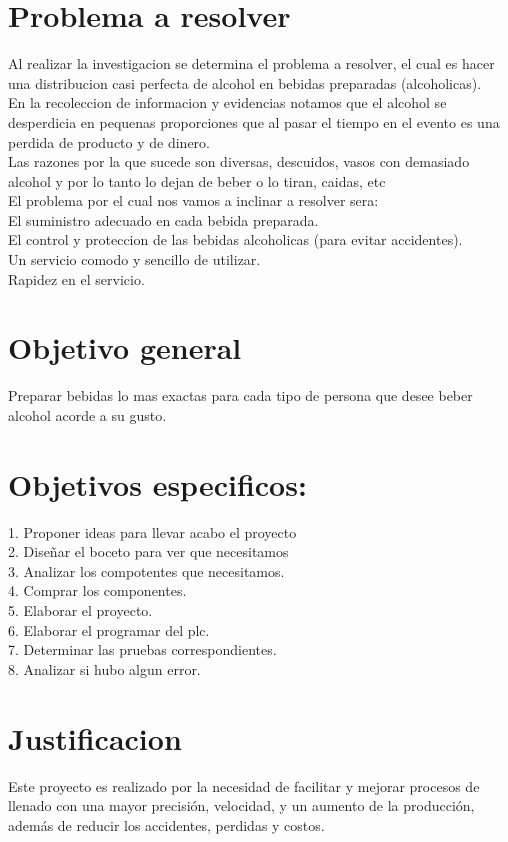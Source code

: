 \documentclass[12pt,a4paper]{article}
\begin{document}
\section{Problema a resolver}
Al realizar la investigacion se determina el problema a resolver, el cual es hacer una distribucion casi perfecta de alcohol en bebidas preparadas (alcoholicas).\\
En la recoleccion de informacion y evidencias notamos que el alcohol se desperdicia en pequenas proporciones que al pasar el tiempo en el evento es una perdida de producto y de dinero.\\
Las razones por la que sucede son diversas, descuidos, vasos con demasiado alcohol y por lo tanto lo dejan de beber o lo tiran, caidas, etc\\El problema por el cual nos vamos a inclinar a resolver sera:\\El suministro adecuado en cada bebida preparada.\\El control y proteccion de las bebidas alcoholicas (para evitar accidentes).\\Un servicio comodo y sencillo de utilizar.\\Rapidez en el servicio.


\section{Objetivo general}
Preparar bebidas lo mas exactas para cada tipo de persona que desee beber alcohol acorde a su gusto.

\section{Objetivos especificos:}
1. Proponer ideas para llevar acabo el proyecto\\2. Diseñar el boceto para ver que necesitamos\\3. Analizar los compotentes que necesitamos.\\4. Comprar los componentes.\\5. Elaborar el proyecto.\\6. Elaborar el programar del plc.\\7. Determinar las pruebas correspondientes.\\8. Analizar si hubo algun error.\\
\section{Justificacion}
Este proyecto es realizado por la necesidad de facilitar y mejorar procesos de llenado con una mayor precisión, velocidad, y un aumento de la producción, además de reducir los accidentes, perdidas y costos.
\end{document}
